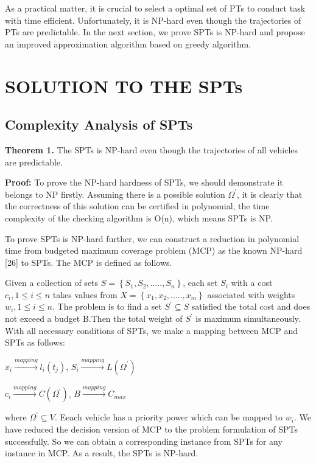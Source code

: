 \documentclass[journal]{IEEEtran}
\begin{document}
As a practical matter, it is crucial to select a optimal set of PTs to conduct task with time efficient. Unfortunately, it is NP-hard even though the trajectories of PTs are predictable. In the next section, we prove SPTs is NP-hard and propose an improved approximation algorithm based on greedy algorithm.
\section{SOLUTION TO THE SPTs}
\subsection{Complexity Analysis of SPTs}
\noindent
\textbf{Theorem 1.} The SPTs is NP-hard even though the trajectories of all vehicles are predictable.

\noindent
\textbf{Proof:} To prove the NP-hard hardness of SPTs, we should demonstrate it belongs to NP firstly. Assuming there is a possible solution $\Omega ^{'}$, it is clearly that the correctness of this solution can be certified in polynomial, the time complexity of the checking algorithm is O(n), which means SPTs is NP.

To prove SPTs is NP-hard further, we can construct a reduction in polynomial time from budgeted maximum coverage problem (MCP) as the known NP-hard [26] to SPTs. The MCP is defined as follows. 

Given a collection of sets $S=\left \{ S_{1},S_{2},.....,S_{n} \right \}$, each set $S_{i}$ with a cost  $c_{i},1\leqslant i\leqslant n$ takes values from $X=\left \{ x_{1},x_{2},.....,x_{m} \right \} $ associated with weights $w_{i},1\leqslant i\leqslant n$. The problem is to find a set $S^{'}\subseteq S$ satisfied the total cost and does not exceed a budget B.Then the total weight of $S^{'}$ is maximum simultaneously.
With all necessary conditions of SPTs, we make a mapping between MCP and SPTs as follows:
\begin{center}
$x_{i}\overset{mapping}{\rightarrow}l_{i}(t_{j})$,
$S_{i}\overset{mapping}{\rightarrow}L({\Omega ^{'}})$	
\end{center}
\begin{center}
$c_{i}\overset{mapping}{\rightarrow}C({\Omega ^{'}})$,
$B\overset{mapping}{\rightarrow}C_{max}$
\end{center}
where $\Omega ^{'}\subseteq V$. Eeach vehicle has a priority power which can be mapped to  $w_{i}$. We have reduced the decision version of MCP to the problem formulation of SPTs successfully. So we can obtain a corresponding instance from SPTs for any instance in MCP. As a result, the SPTs is NP-hard.
\end{document}
